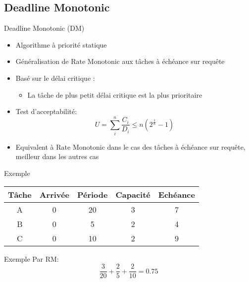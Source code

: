 \subsection{Deadline Monotonic}

\begin{frame}{Deadline Monotonic (DM)} 
  \begin{itemize}
  \item Algorithme à priorité statique
\item Généralisation de Rate Monotonic aux tâches à échéance sur requête
  \item Basé sur le délai critique :
    \begin{itemize}
    \item La tâche de plus petit délai critique est la plus prioritaire
    \end{itemize}
\item Test d'acceptabilité:
  $$U = \sum_i^n \frac{C_i}{D_i} ≤ n \left(2^{\frac{1}{n}}-1\right)$$
  \item Equivalent à Rate Monotonic  dans le cas des tâches à échéance
    sur requête, meilleur dans les autres cas
  \end{itemize}
\end{frame}

\begin{frame}{Exemple}
  \begin{center}
    \begin{tabular}{ccccc}
      \hline
      Tâche & Arrivée & Période & Capacité & Echéance \\
      \hline
      A & 0 & 20 & 3 & 7\\
      B & 0 &  5 & 2 & 4\\
      C & 0 & 10 & 2 & 9\\
      \hline
    \end{tabular}
  \end{center}
\end{frame} 

\begin{frame}{Exemple}
  Par RM:
  $$\frac{3}{20} + \frac{2}{5} + \frac{2}{10} = 0.75$$
\end{frame}

